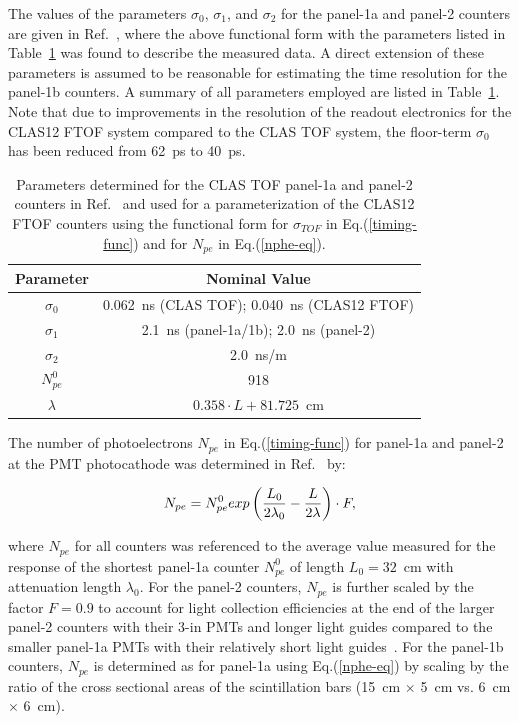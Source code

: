 \documentclass{elsart}
\begin{document}
The values of the parameters $\sigma_0$, $\sigma_1$, and $\sigma_2$ for the panel-1a and panel-2 counters are given
in Ref.~\cite{tof-nim}, where the above functional form with the parameters listed in Table~\ref{timing-parms} was found
to describe the measured data. A direct extension of these parameters is assumed to be reasonable for estimating the
time resolution for the panel-1b counters. A summary of all parameters employed are listed in Table~\ref{timing-parms}.
Note that due to improvements in the resolution of the readout electronics for the CLAS12 FTOF system compared to
the CLAS TOF system, the floor-term $\sigma_0$ has been reduced from 62~ps to 40~ps. 

\begin{table}[htbp]
\begin{center}
\begin{tabular} {c|c} \hline
Parameter    & Nominal Value\\ \hline
$\sigma_0$ & 0.062~ns (CLAS TOF); 0.040~ns (CLAS12 FTOF) \\ \hline
$\sigma_1$  & 2.1~ns (panel-1a/1b); 2.0~ns (panel-2) \\ \hline
$\sigma_2$  & 2.0~ns/m \\ \hline
$N_{pe}^0$   & 918 \\ \hline
$\lambda$   & $0.358\cdot L + 81.725$~cm \\ \hline
\end{tabular}
\caption{Parameters determined for the CLAS TOF panel-1a and panel-2 counters in Ref.~\cite{tof-nim}
and used for a parameterization of the CLAS12 FTOF counters using the functional form for $\sigma_{TOF}$
in Eq.(\ref{timing-func}) and for $N_{pe}$ in Eq.(\ref{nphe-eq}).}
\label{timing-parms}
\end{center}
\end{table}

The number of photoelectrons $N_{pe}$ in Eq.(\ref{timing-func}) for panel-1a and panel-2 at the PMT
photocathode was determined in Ref.~\cite{tof-nim} by:

\begin{equation}
\label{nphe-eq}
N_{pe} = N_{pe}^0 {\rm exp} \left( \frac{L_0}{2 \lambda_0} - \frac{L}{2 \lambda} \right) \cdot F,
\end{equation}

\noindent
where $N_{pe}$ for all counters was referenced to the average value measured for the response of
the shortest panel-1a counter $N_{pe}^0$ of length $L_0=32$~cm with attenuation length $\lambda_0$.
For the panel-2 counters, $N_{pe}$ is further scaled by the factor $F = 0.9$ to account for light
collection efficiencies at the end of the larger panel-2 counters with their 3-in PMTs and longer light
guides compared to the smaller panel-1a PMTs with their relatively short light guides~\cite{tof-nim}. For
the panel-1b counters, $N_{pe}$ is determined as for panel-1a using Eq.(\ref{nphe-eq}) by scaling by the
ratio of the cross sectional areas of the scintillation bars (15~cm $\times$ 5~cm vs. 6~cm $\times$ 6~cm). 
\end{document}
